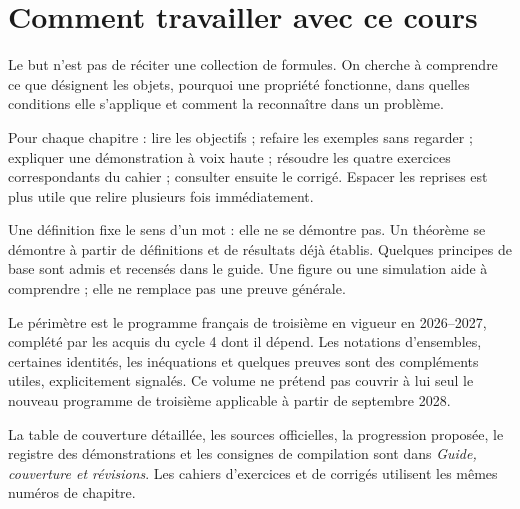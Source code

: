 \documentclass[11pt,a4paper,oneside]{book}
\begin{document}
\frontmatter
\chapter*{Comment travailler avec ce cours}
Le but n'est pas de réciter une collection de formules. On cherche à comprendre ce que désignent les objets, pourquoi une propriété fonctionne, dans quelles conditions elle s'applique et comment la reconnaître dans un problème.

Pour chaque chapitre : lire les objectifs ; refaire les exemples sans regarder ; expliquer une démonstration à voix haute ; résoudre les quatre exercices correspondants du cahier ; consulter ensuite le corrigé. Espacer les reprises est plus utile que relire plusieurs fois immédiatement.

\begin{attention}
Une définition fixe le sens d'un mot : elle ne se démontre pas. Un théorème se démontre à partir de définitions et de résultats déjà établis. Quelques principes de base sont admis et recensés dans le guide. Une figure ou une simulation aide à comprendre ; elle ne remplace pas une preuve générale.
\end{attention}

Le périmètre est le programme français de troisième en vigueur en 2026--2027, complété par les acquis du cycle 4 dont il dépend. Les notations d'ensembles, certaines identités, les inéquations et quelques preuves sont des compléments utiles, explicitement signalés. Ce volume ne prétend pas couvrir à lui seul le nouveau programme de troisième applicable à partir de septembre 2028.

La table de couverture détaillée, les sources officielles, la progression proposée, le registre des démonstrations et les consignes de compilation sont dans \emph{Guide, couverture et révisions}. Les cahiers d'exercices et de corrigés utilisent les mêmes numéros de chapitre.

\tableofcontents
\mainmatter




















\end{document}
